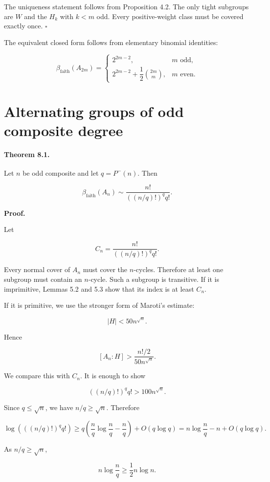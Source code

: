 \documentclass[11pt]{article}
\begin{document}
The uniqueness statement follows from Proposition 4.2. The only tight subgroups are $W$ and the $H_k$ with $k<m$ odd. Every positive-weight class must be covered exactly once. $\square$

The equivalent closed form follows from elementary binomial identities:

\[
\beta_{\mathrm{faith}}(A_{2m})
=
\begin{cases}
2^{2m-2}, & m\text{ odd},\\[4pt]
2^{2m-2}+\dfrac12\binom{2m}{m}, & m\text{ even}.
\end{cases}
\]

\section{Alternating groups of odd composite degree}

\paragraph{Theorem 8.1.}

Let $n$ be odd composite and let $q=P^-(n)$. Then

\[
\beta_{\mathrm{faith}}(A_n)
\sim
\frac{n!}{((n/q)!)^q q!}.
\]

\noindent\textbf{Proof.}

Let

\[
C_n=\frac{n!}{((n/q)!)^q q!}.
\]

Every normal cover of $A_n$ must cover the $n$-cycles. Therefore at least one subgroup must contain an $n$-cycle. Such a subgroup is transitive. If it is imprimitive, Lemmas 5.2 and 5.3 show that its index is at least $C_n$.

If it is primitive, we use the stronger form of Maroti's estimate:

\[
|H|<50n^{\sqrt n}.
\]

Hence

\[
[A_n:H]>\frac{n!/2}{50n^{\sqrt n}}.
\]

We compare this with $C_n$. It is enough to show

\[
((n/q)!)^q q!>100n^{\sqrt n}.
\]

Since $q\le \sqrt n$, we have $n/q\ge \sqrt n$. Therefore

\[
\log\left(((n/q)!)^q q!\right)
\ge
q\left(\frac nq\log\frac nq-\frac nq\right)+O(q\log q)
=
n\log\frac nq-n+O(q\log q).
\]

As $n/q\ge\sqrt n$,

\[
n\log\frac nq\ge \frac12 n\log n.
\]
\end{document}
